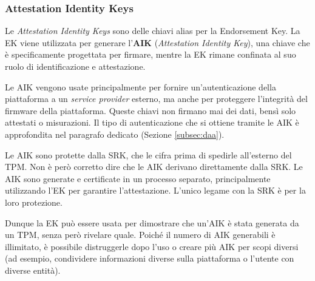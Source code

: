 \subsubsection{Attestation Identity Keys}
Le \textit{Attestation Identity Keys} sono delle chiavi alias per la Endorsement Key. La EK viene utilizzata per generare l'\textbf{AIK} (\textit{Attestation Identity Key}), una chiave che è specificamente progettata per firmare, mentre la EK rimane confinata al suo ruolo di identificazione e attestazione.

Le AIK vengono usate principalmente per fornire un'autenticazione della piattaforma a un \textit{service provider} esterno, ma anche per proteggere l’integrità del firmware della piattaforma. Queste chiavi non firmano mai dei dati, bensì solo attestati o misurazioni. Il tipo di autenticazione che si ottiene tramite le AIK è approfondita nel paragrafo dedicato (Sezione \ref{subsec:daa}). 

Le AIK sono protette dalla SRK, che le cifra prima di spedirle all’esterno del TPM. Non è però corretto dire che le AIK derivano direttamente dalla SRK. Le AIK sono generate e certificate in un processo separato, principalmente utilizzando l'EK per garantire l'attestazione. L’unico legame con la SRK è per la loro protezione.

Dunque la EK può essere usata per dimostrare che un’AIK è stata generata da un TPM, senza però rivelare quale. Poiché il numero di AIK generabili è illimitato, è possibile distruggerle dopo l’uso o creare più AIK per scopi diversi (ad esempio, condividere informazioni diverse sulla piattaforma o l’utente con diverse entità). 

